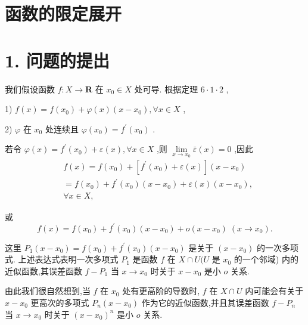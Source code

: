 \section{函数的限定展开}

\section*{1. 问题的提出}

我们假设函数 $f : X \rightarrow  \mathbf{R}$ 在 ${x}_{0} \in  X$ 处可导. 根据定理 $6 \cdot  1 \cdot  2$ ,

1) $f\left( x\right)  = f\left( {x}_{0}\right)  + \varphi \left( x\right) \left( {x - {x}_{0}}\right) ,\forall x \in  X$ ,

2) $\varphi$ 在 ${x}_{0}$ 处连续且 $\varphi \left( {x}_{0}\right)  = {f}^{\prime }\left( {x}_{0}\right)$ .

若令 $\varphi \left( x\right)  = {f}^{\prime }\left( {x}_{0}\right)  + \varepsilon \left( x\right) ,\forall x \in  X$ ,则 $\mathop{\lim }\limits_{{x \rightarrow  {x}_{0}}}\bar{\varepsilon }\left( x\right)  = 0$ ,因此
\begin{align*}
	&f\left( x\right)  = f\left( {x}_{0}\right)  + \left\lbrack  {{f}^{\prime }\left( {x}_{0}\right)  + \varepsilon \left( x\right) }\right\rbrack  \left( {x - {x}_{0}}\right)\\
	&= f\left( {x}_{0}\right)  + {f}^{\prime }\left( {x}_{0}\right) \left( {x - {x}_{0}}\right)  + \varepsilon \left( x\right) \left( {x - {x}_{0}}\right) ,\\
	&\forall x \in  X,
\end{align*}

或
$$f\left( x\right)  = f\left( {x}_{0}\right)  + {f}^{\prime }\left( {x}_{0}\right) \left( {x - {x}_{0}}\right)  + o\left( {x - {x}_{0}}\right) \;\left( {x \rightarrow  {x}_{0}}\right) .$$

这里 ${P}_{1}\left( {x - {x}_{0}}\right)  = f\left( {x}_{0}\right)  + {f}^{\prime }\left( {x}_{0}\right) \left( {x - {x}_{0}}\right)$ 是关于 $\left( {x - {x}_{0}}\right)$ 的一次多项式. 上述表达式表明一次多项式 ${P}_{1}$ 是函数 $f$ 在 $X \cap  U(U$ 是 ${x}_{0}$ 的一个邻域) 内的近似函数,其误差函数 $f - {P}_{1}$ 当 $x \rightarrow  {x}_{0}$ 时关于 $x - {x}_{0}$ 是小 $o$ 关系.

由此我们很自然想到,当 $f$ 在 ${x}_{0}$ 处有更高阶的导数时, $f$ 在 $X \cap  U$ 内可能会有关于 $x - {x}_{0}$ 更高次的多项式 ${P}_{n}\left( {x - {x}_{0}}\right)$ 作为它的近似函数,并且其误差函数 $f - {P}_{n}$ 当 $x \rightarrow  {x}_{0}$ 时关于 ${\left( x - {x}_{0}\right) }^{n}$ 是小 $o$ 关系.

